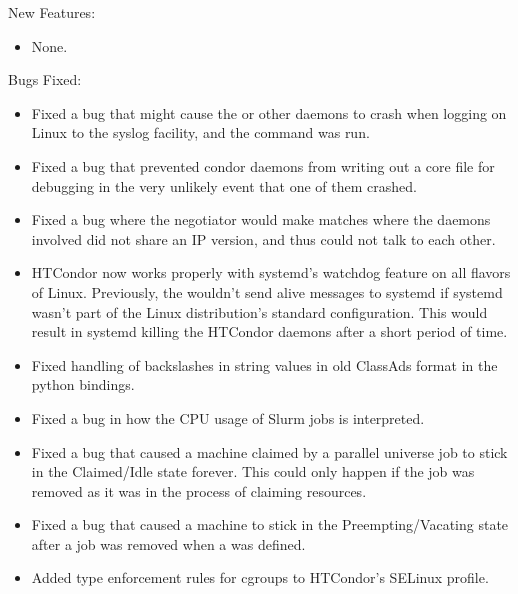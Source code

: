 \noindent New Features:

\begin{itemize}

\item None.

\end{itemize}

\noindent Bugs Fixed:

\begin{itemize}

\item Fixed a bug that might cause the  or other daemons to
crash when logging on Linux to the syslog facility, and the 
command was run.

\item Fixed a bug that prevented condor daemons from writing out a
core file for debugging in the very unlikely event that one of them
crashed.

\item Fixed a bug where the negotiator would make matches where the daemons
involved did not share an IP version, and thus could not talk to each other.

\item HTCondor now works properly with systemd's watchdog feature on
all flavors of Linux.
Previously, the  wouldn't send alive messages to systemd
if systemd wasn't part of the Linux distribution's standard configuration.
This would result in systemd killing the HTCondor daemons after a
short period of time.

\item Fixed handling of backslashes in string values in old ClassAds
format in the python bindings.

\item Fixed a bug in how the CPU usage of Slurm jobs is interpreted.

\item Fixed a bug that caused a machine claimed by a parallel universe
job to stick in the Claimed/Idle state forever.  This could only happen
if the job was removed as it was in the process of claiming resources.

\item Fixed a bug that caused a machine to stick in the
Preempting/Vacating state after a job was removed
when a  was defined.

\item Added type enforcement rules for cgroups to HTCondor's SELinux
profile.


\end{itemize}
